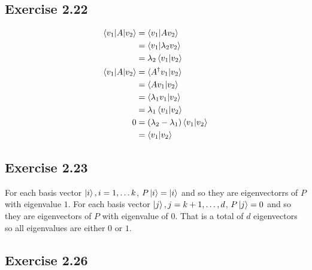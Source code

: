 \documentclass{article}
\begin{document}
\subsection*{Exercise 2.22}

\begin{align*}
  \braket{v_1 | A | v_2} & = \braket{v_1 | A v_2}                       \\
                         & = \braket{v_1 | \lambda_2 v_2}               \\
                         & = \lambda_2 \braket{v_1 | v_2}               \\
  \braket{v_1 | A | v_2} & = \braket{A^\dag v_1 | v_2}                  \\
                         & = \braket{A v_1 | v_2}                       \\
                         & = \braket{\lambda_1 v_1 | v_2}               \\
                         & = \lambda_1 \braket{v_1 | v_2}               \\
  0                      & = (\lambda_2 - \lambda_1) \braket{v_1 | v_2} \\
                         & = \braket{v_1 | v_2}                         \\
\end{align*}

\subsection*{Exercise 2.23}

For each basis vector $\ket{i}, i = 1, \ldots k$, $P \ket{i} = \ket{i}$ and so they are eigenvectorrs of $P$ with eigenvalue $1$. For each basis vector $\ket{j}, j = k + 1, \ldots, d$, $P \ket{j} = 0$ and so they are eigenvectors of $P$ with eigenvalue of $0$. That is a total of $d$ eigenvectors so all eigenvalues are either $0$ or $1$.

\subsection*{Exercise 2.26}
\end{document}
